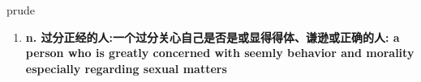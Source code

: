 
\begin{frame}
{\huge prude}
\begin{center}
\begin{enumerate}\Large
  \item \textbf{n. 过分正经的人:一个过分关心自己是否是或显得得体、谦逊或正确的人: a person who is greatly concerned with seemly behavior and morality especially regarding sexual matters}
\end{enumerate}
\end{center}
\end{frame}
